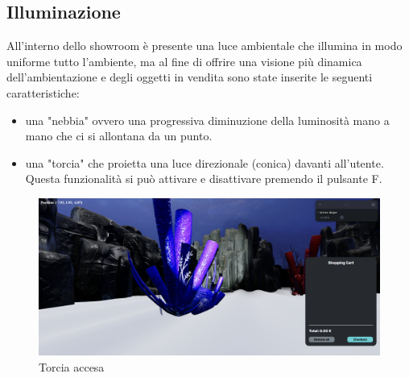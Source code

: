 \subsection{Illuminazione}
All'interno dello showroom è presente una luce ambientale che illumina in modo uniforme tutto l'ambiente, ma al fine di offrire una visione più dinamica dell'ambientazione e degli oggetti in vendita sono state inserite le seguenti caratteristiche:
\begin{itemize}
	\item una "nebbia" ovvero una progressiva diminuzione della luminosità mano a mano che ci si allontana da un punto.
	\item una "torcia" che proietta una luce direzionale (conica) davanti all'utente. Questa funzionalità si può attivare e disattivare premendo il pulsante F.
\end{itemize}

\begin{figure}[H]
  \renewcommand{\thefigure}{7}
  \includegraphics[width=\linewidth]{./res/images/torcia.png}
  \caption{Torcia accesa}
  \label{Torcia acccesa}
\end{figure}


